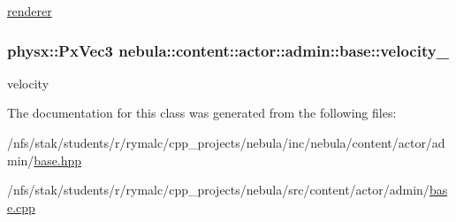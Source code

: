 \hyperlink{namespacenebula_1_1content_1_1actor_1_1renderer}{renderer} \hypertarget{classnebula_1_1content_1_1actor_1_1admin_1_1base_ab048afac3235aaa8f0946e8ece5eab55}{
\subsubsection[{velocity\_\-}]{\setlength{\rightskip}{0pt plus 5cm}physx::PxVec3 {\bf nebula::content::actor::admin::base::velocity\_\-}}}
\label{classnebula_1_1content_1_1actor_1_1admin_1_1base_ab048afac3235aaa8f0946e8ece5eab55}


velocity 

The documentation for this class was generated from the following files:\begin{DoxyCompactItemize}
\item 
/nfs/stak/students/r/rymalc/cpp\_\-projects/nebula/inc/nebula/content/actor/admin/\hyperlink{inc_2nebula_2content_2actor_2admin_2base_8hpp}{base.hpp}\item 
/nfs/stak/students/r/rymalc/cpp\_\-projects/nebula/src/content/actor/admin/\hyperlink{src_2content_2actor_2admin_2base_8cpp}{base.cpp}\end{DoxyCompactItemize}
